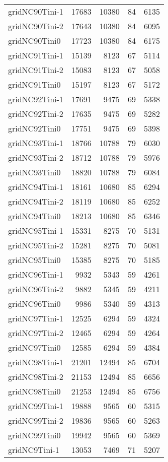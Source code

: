 \begin{longtable}{lrrrr}
gridNC90Tini-1 & 17683 & 10380 & 84 & 6135 \\
gridNC90Tini-2 & 17643 & 10380 & 84 & 6095 \\
gridNC90Tini0 & 17723 & 10380 & 84 & 6175 \\
gridNC91Tini-1 & 15139 & 8123 & 67 & 5114 \\
gridNC91Tini-2 & 15083 & 8123 & 67 & 5058 \\
gridNC91Tini0 & 15197 & 8123 & 67 & 5172 \\
gridNC92Tini-1 & 17691 & 9475 & 69 & 5338 \\
gridNC92Tini-2 & 17635 & 9475 & 69 & 5282 \\
gridNC92Tini0 & 17751 & 9475 & 69 & 5398 \\
gridNC93Tini-1 & 18766 & 10788 & 79 & 6030 \\
gridNC93Tini-2 & 18712 & 10788 & 79 & 5976 \\
gridNC93Tini0 & 18820 & 10788 & 79 & 6084 \\
gridNC94Tini-1 & 18161 & 10680 & 85 & 6294 \\
gridNC94Tini-2 & 18119 & 10680 & 85 & 6252 \\
gridNC94Tini0 & 18213 & 10680 & 85 & 6346 \\
gridNC95Tini-1 & 15331 & 8275 & 70 & 5131 \\
gridNC95Tini-2 & 15281 & 8275 & 70 & 5081 \\
gridNC95Tini0 & 15385 & 8275 & 70 & 5185 \\
gridNC96Tini-1 & 9932 & 5343 & 59 & 4261 \\
gridNC96Tini-2 & 9882 & 5345 & 59 & 4211 \\
gridNC96Tini0 & 9986 & 5340 & 59 & 4313 \\
gridNC97Tini-1 & 12525 & 6294 & 59 & 4324 \\
gridNC97Tini-2 & 12465 & 6294 & 59 & 4264 \\
gridNC97Tini0 & 12585 & 6294 & 59 & 4384 \\
gridNC98Tini-1 & 21201 & 12494 & 85 & 6704 \\
gridNC98Tini-2 & 21153 & 12494 & 85 & 6656 \\
gridNC98Tini0 & 21253 & 12494 & 85 & 6756 \\
gridNC99Tini-1 & 19888 & 9565 & 60 & 5315 \\
gridNC99Tini-2 & 19836 & 9565 & 60 & 5263 \\
gridNC99Tini0 & 19942 & 9565 & 60 & 5369 \\
gridNC9Tini-1 & 13053 & 7469 & 71 & 5207 \\

\end{longtable}
